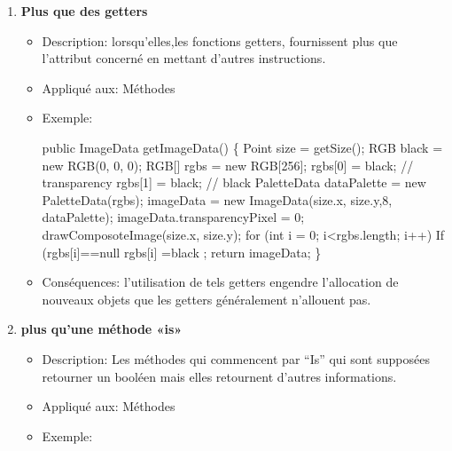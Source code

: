 \begin{enumerate}
    

\item \textbf{Plus que des getters} 
\begin{itemize}
\item Description: lorsqu’elles,les fonctions getters, fournissent plus que l’attribut concerné en mettant d’autres instructions.
\item Appliqué aux: Méthodes
\item Exemple: 
\begin{framed}

    {
\selectfont
public ImageData getImageData() \{ \newline
 Point size = getSize();\newline
RGB black = new RGB(0, 0, 0);\newline
RGB[] rgbs = new RGB[256];\newline
rgbs[0] = black; // transparency\newline
rgbs[1] = black; // black\newline
PaletteData dataPalette = new PaletteData(rgbs);\newline
imageData = new\newline
 ImageData(size.x, size.y,8, dataPalette);\newline
imageData.transparencyPixel = 0;\newline
drawComposoteImage(size.x, size.y);\newline
 for (int i = 0; i<rgbs.length; i++)\newline
 If (rgbs[i]==null rgbs[i] =black ;\newline
return imageData;\newline
\}

}
\end{framed}
\item Conséquences: l’utilisation de tels getters engendre l’allocation de nouveaux objets que les getters généralement n’allouent pas.
\end{itemize}
\item \textbf{plus qu’une méthode «is»}
\begin{itemize}
\item Description: Les méthodes qui commencent par “Is” qui sont supposées retourner un booléen mais elles retournent d’autres informations.
\item Appliqué aux: Méthodes
\item Exemple:
\begin{framed}


\end{framed}
\end{itemize}
\end{enumerate}
